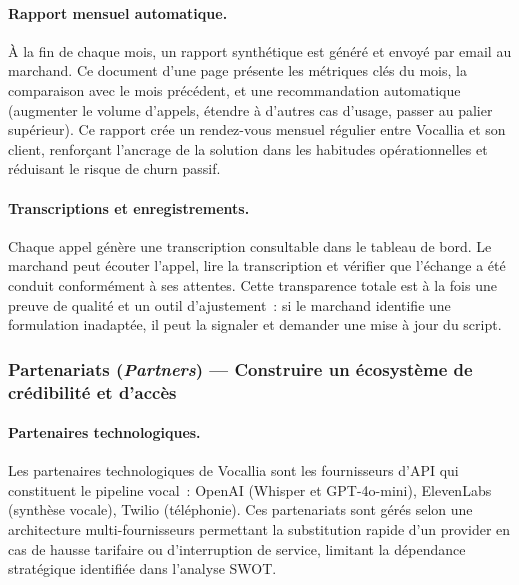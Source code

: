 \paragraph{Rapport mensuel automatique.}
À la fin de chaque mois, un rapport synthétique est généré et envoyé par email
au marchand. Ce document d'une page présente les métriques clés du mois, la
comparaison avec le mois précédent, et une recommandation automatique
(augmenter le volume d'appels, étendre à d'autres cas d'usage, passer au palier
supérieur). Ce rapport crée un rendez-vous mensuel régulier entre Vocallia et
son client, renforçant l'ancrage de la solution dans les habitudes opérationnelles
et réduisant le risque de churn passif.

\paragraph{Transcriptions et enregistrements.}
Chaque appel génère une transcription consultable dans le tableau de bord.
Le marchand peut écouter l'appel, lire la transcription et vérifier que l'échange
a été conduit conformément à ses attentes. Cette transparence totale est à la
fois une preuve de qualité et un outil d'ajustement~: si le marchand identifie
une formulation inadaptée, il peut la signaler et demander une mise à jour du script.

\subsubsection{Partenariats (\textit{Partners}) --- Construire un écosystème
de crédibilité et d'accès}

\paragraph{Partenaires technologiques.}
Les partenaires technologiques de Vocallia sont les fournisseurs d'API qui
constituent le pipeline vocal~: OpenAI (Whisper et GPT-4o-mini), ElevenLabs
(synthèse vocale), Twilio (téléphonie). Ces partenariats sont gérés selon une
architecture multi-fournisseurs permettant la substitution rapide d'un provider
en cas de hausse tarifaire ou d'interruption de service, limitant la
dépendance stratégique identifiée dans l'analyse SWOT.

